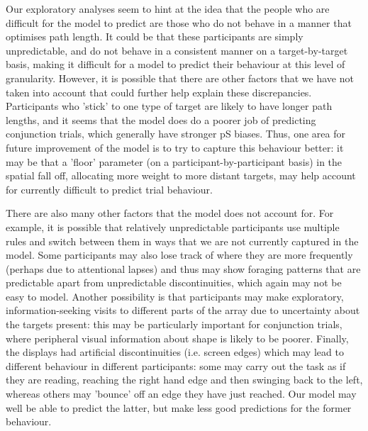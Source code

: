\documentclass[preprints, article,submit,pdftex,moreauthors]{Definitions/mdpi}
\begin{document}
Our exploratory analyses seem to hint at the idea that the people who are difficult for the model to predict are those who do not behave in a manner that optimises path length. It could be that these participants are simply unpredictable, and do not behave in a consistent manner on a target-by-target basis, making it difficult for a model to predict their behaviour at this level of granularity. However, it is possible that there are other factors that we have not taken into account that could further help explain these discrepancies. Participants who 'stick' to one type of target are likely to have longer path lengths, and it seems that the model does do a poorer job of predicting conjunction trials, which generally have stronger pS biases. Thus, one area for future improvement of the model is to try to capture this behaviour better: it may be that a 'floor' parameter (on a participant-by-participant basis) in the spatial fall off, allocating more weight to more distant targets, may help account for currently difficult to predict trial behaviour.

There are also many other factors that the model does not account for. For example, it is possible that relatively unpredictable participants use multiple rules and switch between them in ways that we are not currently captured in the model. Some participants may also lose track of where they are more frequently (perhaps due to attentional lapses) and thus may show foraging patterns that are predictable apart from unpredictable discontinuities, which again may not be easy to model. Another possibility is that participants may make exploratory, information-seeking visits to different parts of the array due to uncertainty about the targets present: this may be particularly important for conjunction trials, where peripheral visual information about shape is likely to be poorer. Finally, the displays had artificial discontinuities (i.e. screen edges) which may lead to different behaviour in different participants: some may carry out the task as if they are reading, reaching the right hand edge and then swinging back to the left, whereas others may 'bounce' off an edge they have just reached. Our model may well be able to predict the latter, but make less good predictions for the former behaviour.
\end{document}
